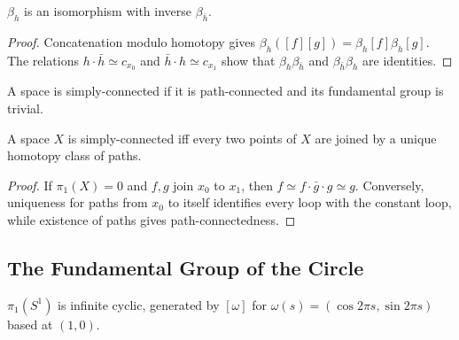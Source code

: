 \begin{proposition}
\label{prop:change-of-basepoint-isomorphism}
\leanok
{}
$\beta_h$ is an isomorphism with inverse $\beta_{\bar h}$.
\end{proposition}

\begin{proof}
\leanok
\sketch Concatenation modulo homotopy gives
$\beta_h([f][g])=\beta_h[f]\beta_h[g]$. The relations
$h\cdot\bar h\simeq c_{x_0}$ and $\bar h\cdot h\simeq c_{x_1}$ show that
$\beta_h\beta_{\bar h}$ and $\beta_{\bar h}\beta_h$ are identities.
\end{proof}

\begin{definition}
\label{def:simply-connected}
\leanok
{}
A space is simply-connected if it is path-connected and its fundamental group
is trivial.
\end{definition}

\begin{proposition}
\label{prop:simply-connected-iff-unique-path-class}
\leanok
{}
A space $X$ is simply-connected iff every two points of $X$ are joined by a
unique homotopy class of paths.
\end{proposition}

\begin{proof}
\leanok
\sketch If $\pi_1(X)=0$ and $f,g$ join $x_0$ to $x_1$, then
$f\simeq f\cdot\bar g\cdot g\simeq g$. Conversely, uniqueness for paths from
$x_0$ to itself identifies every loop with the constant loop, while existence
of paths gives path-connectedness.
\end{proof}

\subsection*{The Fundamental Group of the Circle}

\begin{theorem}
\label{thm:fundamental-group-of-circle}
\leanok
{}
$\pi_1(S^1)$ is infinite cyclic, generated by $[\omega]$ for
$\omega(s)=(\cos2\pi s,\sin2\pi s)$ based at $(1,0)$.
\end{theorem}

